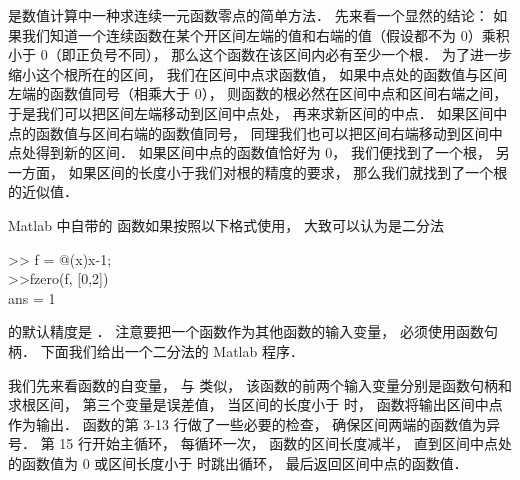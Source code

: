 
 是数值计算中一种求连续一元函数零点的简单方法． 先来看一个显然的结论： 如果我们知道一个连续函数在某个开区间左端的值和右端的值（假设都不为 0）乘积小于 0（即正负号不同）， 那么这个函数在该区间内必有至少一个根． 为了进一步缩小这个根所在的区间， 我们在区间中点求函数值， 如果中点处的函数值与区间左端的函数值同号（相乘大于 0）， 则函数的根必然在区间中点和区间右端之间， 于是我们可以把区间左端移动到区间中点处， 再来求新区间的中点． 如果区间中点的函数值与区间右端的函数值同号， 同理我们也可以把区间右端移动到区间中点处得到新的区间． 如果区间中点的函数值恰好为 0， 我们便找到了一个根， 另一方面， 如果区间的长度小于我们对根的精度的要求， 那么我们就找到了一个根的近似值．

Matlab 中自带的  函数如果按照以下格式使用， 大致可以认为是二分法
\begin{Command}
>> f = @(x)x-1; \\
>>fzero(f, [0,2])\\
ans = 1
\end{Command}
 的默认精度是 ． 注意要把一个函数作为其他函数的输入变量， 必须使用函数句柄． 下面我们给出一个二分法的 Matlab 程序．


我们先来看函数的自变量， 与  类似， 该函数的前两个输入变量分别是函数句柄和求根区间， 第三个变量是误差值， 当区间的长度小于  时， 函数将输出区间中点作为输出． 函数的第 3-13 行做了一些必要的检查， 确保区间两端的函数值为异号． 第 15 行开始主循环， 每循环一次， 函数的区间长度减半， 直到区间中点处的函数值为 0 或区间长度小于  时跳出循环， 最后返回区间中点的函数值．